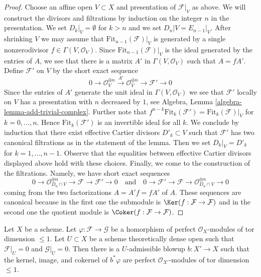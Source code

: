 \begin{proof}
\medskip\noindent
Choose an affine open $V \subset X$ and presentation of $\mathcal{F}|_V$
as above. We will construct the divisors and filtrations by induction
on the integer $n$ in the presentation. We set $D_k|_V = \emptyset$
for $k > n$ and we set $D_n|V = E_{n - 1}|_V$.
After shrinking $V$ we may assume that
$\text{Fit}_{n - 1}(\mathcal{F})|_V$ is generated by a
single nonzerodivisor $f \in \Gamma(V, \mathcal{O}_V)$.
Since $\text{Fit}_{n - 1}(\mathcal{F})|_V$ is the ideal generated
by the entries of $A$, we see that there is a matrix
$A'$ in $\Gamma(V, \mathcal{O}_V)$ such that $A = fA'$.
Define $\mathcal{F}'$ on $V$ by the short exact sequence
$$
0 \to \mathcal{O}_V^{\oplus n} \xrightarrow{A'} \mathcal{O}_V^{\oplus n} \to
\mathcal{F}' \to 0
$$
Since the entries of $A'$ generate the unit ideal in
$\Gamma(V, \mathcal{O}_V)$ we see that $\mathcal{F}'$
locally on $V$ has a presentation with $n$ decreased
by $1$, see Algebra, Lemma \ref{algebra-lemma-add-trivial-complex}.
Further note that
$f^{n - k}\text{Fit}_k(\mathcal{F}') = \text{Fit}_k(\mathcal{F})|_V$
for $k = 0, \ldots, n$. Hence $\text{Fit}_k(\mathcal{F}')$
is an invertible ideal for all $k$. We conclude by induction
that there exist effective Cartier divisors $D'_k \subset V$
such that $\mathcal{F}'$ has two canonical filtrations as in the statement
of the lemma. Then we set $D_k|_V = D'_k$ for $k = 1, \ldots, n - 1$.
Observe that the equalities between effective Cartier divisors
displayed above hold with these choices. Finally, we come
to the construction of the filtrations. Namely,
we have short exact sequences
$$
0 \to
\mathcal{O}_{D_n \cap V}^{\oplus n} \to
\mathcal{F} \to \mathcal{F}' \to 0
\quad\text{and}\quad
0 \to
\mathcal{F}' \to \mathcal{F} \to
\mathcal{O}_{D_n \cap V}^{\oplus n} \to 0
$$
coming from the two factorizations $A = A'f = f A'$ of $A$.
These sequences are canonical because in the first one
the submodule is $\Ker(f : \mathcal{F} \to \mathcal{F})$
and in the second one the quotient module is
$\Coker(f : \mathcal{F} \to \mathcal{F})$.
\end{proof}

\begin{lemma}
\label{lemma-blowup-map-pd1}
Let $X$ be a scheme. Let $\varphi : \mathcal{F} \to \mathcal{G}$
be a homorphism of perfect $\mathcal{O}_X$-modules of tor dimension $\leq 1$.
Let $U \subset X$ be a scheme theoretically dense open
such that $\mathcal{F}|_U = 0$ and $\mathcal{G}|_U = 0$.
Then there is a $U$-admissible blowup $b : X' \to X$ such that
the kernel, image, and cokernel of $b^*\varphi$ are
perfect $\mathcal{O}_{X'}$-modules of tor dimension $\leq 1$.
\end{lemma}

